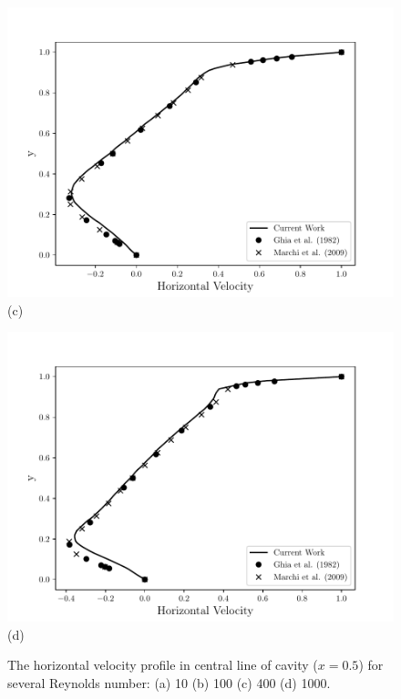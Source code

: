 \begin{center}
\begin{figure}[H]
\begin{minipage}{.5\linewidth}
      \centering
      \includegraphics[scale=0.53]{./02_chaps/cap_validation/figure/Re_400_u_profile.pdf}\\
      (c)
     \end{minipage}%
     \begin{minipage}{.5\linewidth}
      \centering
      \includegraphics[scale=0.53]{./02_chaps/cap_validation/figure/Re_1000_u_profile.pdf}\\
      (d)
     \end{minipage}
     \medskip
     \caption{The horizontal velocity profile in central line of cavity ($x=0.5$) for several Reynolds number:
     (a) 10
     (b) 100
     (c) 400
     (d) 1000.}
     \label{velocity vx cavity}
\end{figure}
\end{center}

